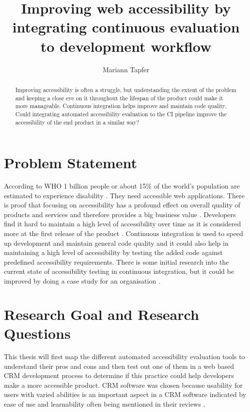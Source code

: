 \documentclass{thesis_proposal}
\title{Improving web accessibility by integrating continuous evaluation to development workflow}
\author{Mariann Tapfer}
\begin{document}
\maketitle

\begin{abstract}
    Improving accessibility is often a struggle, but understanding the extent of the problem and keeping a close eye on it throughout the lifespan of the product could make it more manageable. Continuous integration helps improve and maintain code quality. Could integrating automated accessibility evaluation to the CI pipeline improve the accessibility of the end product in a similar way?
\end{abstract}

\section{Problem Statement}
According to WHO 1 billion people or about 15\% of the world's population are estimated to experience disability \citep{WHO_disability_2021}. They need accessible web applications. There is proof that focusing on accessibility has a profound effect on overall quality of products and services and therefore provides a big business value \citep{miesenberger_user_2020}.
Developers find it hard to maintain a high level of accessibility over time as it is considered more at the first release of the product \citep{paterno_requirements_2020}. Continuous integration is used to speed up development and maintain general code quality \citep{zhao_impact_2017} and it could also help in maintaining a high level of accessibility by testing the added code against predefined accessibility requirements. There is some initial research into the current state of accessibility testing in continuous integration, but it could be improved by doing a case study for an organisation \citep{sane_brief_2021}.


\section{Research Goal and Research Questions}
This thesis will first map the different automated accessibility evaluation tools to understand their pros and cons and then test out one of them in a web based CRM development process to determine if this practice could help developers make a more accessible product. CRM software was chosen because usability for users with varied abilities is an important aspect in a CRM software indicated by ease of use and learnability often being mentioned in their reviews \citep{sevilla_best_2022, 23_best_CRM}.
\end{document}
